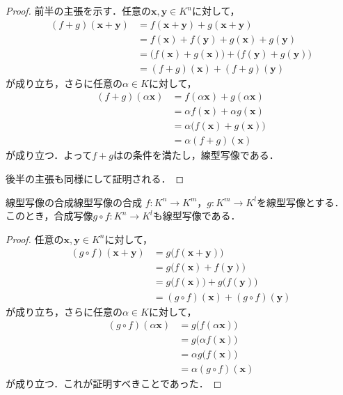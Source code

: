 \begin{leftbar}
\begin{proof}
  前半の主張を示す．任意の$\bm{x}, \bm{y} \in K^n$に対して，
  \begin{align}
    (f + g)(\bm{x} + \bm{y}) &= f(\bm{x} + \bm{y}) + g(\bm{x} + \bm{y}) \tag{$f+g$の定義} \\
    &= f(\bm{x}) + f(\bm{y}) + g(\bm{x}) + g(\bm{y}) \tag{$f,g$の線型性} \\
    &= \bigl(f(\bm{x}) + g(\bm{x})\bigr) + \bigl(f(\bm{y}) + g(\bm{y})\bigr) \nonumber \\
    &= (f + g)(\bm{x}) + (f + g)(\bm{y}) \tag{$f+g$の定義}
  \end{align}
  が成り立ち，さらに任意の$\alpha \in K$に対して，
  \begin{align}
    (f + g)(\alpha\bm{x}) &= f(\alpha\bm{x}) + g(\alpha\bm{x}) \tag{$f+g$の定義} \\
    &= \alpha f(\bm{x}) + \alpha g(\bm{x}) \tag{$f,g$の線型性} \\
    &= \alpha\bigl(f(\bm{x}) + g(\bm{x})\bigr) \nonumber \\
    &= \alpha(f + g)(\bm{x}) \tag{$f+g$の定義}
  \end{align}
  が成り立つ．よって$f + g$はの条件を満たし，線型写像である．

  後半の主張も同様にして証明される．
\end{proof}
\end{leftbar}

\begin{prop}{線型写像の合成}{線型写像の合成}
  $f \colon K^n \to K^m$，$g \colon K^m \to K^l$を線型写像とする．
  このとき，合成写像$g \circ f \colon K^n \to K^l$も線型写像である．
\end{prop}

\begin{leftbar}
\begin{proof}
  任意の$\bm{x}, \bm{y} \in K^n$に対して，
  \begin{align}
    (g \circ f)(\bm{x} + \bm{y}) &= g\bigl(f(\bm{x} + \bm{y})\bigr) \nonumber \\
    &= g\bigl(f(\bm{x}) + f(\bm{y})\bigr) \tag{$f$の線型性} \\
    &= g\bigl(f(\bm{x})\bigr) + g\bigl(f(\bm{y})\bigr) \tag{$g$の線型性} \\
    &= (g \circ f)(\bm{x}) + (g \circ f)(\bm{y}) \nonumber
  \end{align}
  が成り立ち，さらに任意の$\alpha \in K$に対して，
  \begin{align}
    (g \circ f)(\alpha\bm{x}) &= g\bigl(f(\alpha\bm{x})\bigr) \nonumber \\
    &= g\bigl(\alpha f(\bm{x})\bigr) \tag{$f$の線型性} \\
    &= \alpha g\bigl(f(\bm{x})\bigr) \tag{$g$の線型性} \\
    &= \alpha(g \circ f)(\bm{x}) \nonumber
  \end{align}
  が成り立つ．これが証明すべきことであった．
\end{proof}
\end{leftbar}

